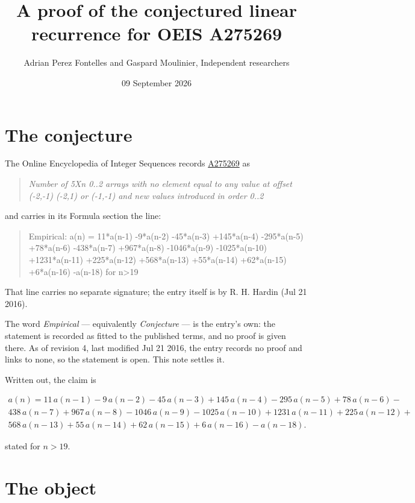 \documentclass[11pt]{article}
\title{A proof of the conjectured linear recurrence for OEIS A275269}
\author{Adrian Perez Fontelles and Gaspard Moulinier, Independent researchers}
\date{09 September 2026}
\theoremstyle{definition}
\begin{document}
\maketitle
\section{The conjecture}

The Online Encyclopedia of Integer Sequences records \href{https://oeis.org/A275269}{A275269} as

\begin{quote}\itshape Number of 5Xn 0..2 arrays with no element equal to any value at offset (-2,-1) (-2,1) or (-1,-1) and new values introduced in order 0..2\end{quote}

and carries in its Formula section the line:

\begin{quote}\ttfamily Empirical: a(n) = 11*a(n-1) -9*a(n-2) -45*a(n-3) +145*a(n-4) -295*a(n-5) +78*a(n-6) -438*a(n-7) +967*a(n-8) -1046*a(n-9) -1025*a(n-10) +1231*a(n-11) +225*a(n-12) +568*a(n-13) +55*a(n-14) +62*a(n-15) +6*a(n-16) -a(n-18) for n>19\end{quote}

That line carries no separate signature; the entry itself is by R. H. Hardin (Jul 21 2016).

The word {\itshape Empirical} --- equivalently {\itshape Conjecture} --- is the entry's own: the statement is recorded as fitted to the published terms, and no proof is given there. As of revision 4, last modified Jul 21 2016, the entry records no proof and links to none, so the statement is open. This note settles it.

Written out, the claim is

\begin{multline*} a(n) = 11\,a(n-1) - 9\,a(n-2) - 45\,a(n-3) + 145\,a(n-4) - 295\,a(n-5) + 78\,a(n-6) - \\ 438\,a(n-7) + 967\,a(n-8) - 1046\,a(n-9) - 1025\,a(n-10) + 1231\,a(n-11) + 225\,a(n-12) + \\ 568\,a(n-13) + 55\,a(n-14) + 62\,a(n-15) + 6\,a(n-16) - a(n-18). \end{multline*}

stated for $n > 19$.

\section{The object}
\end{document}
